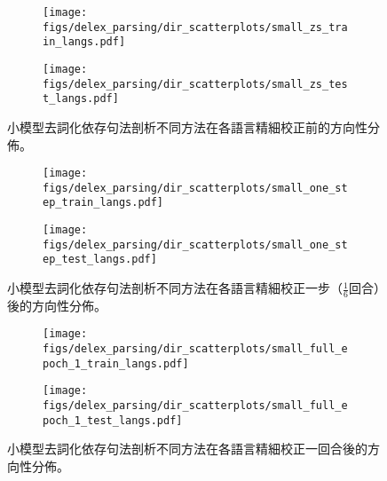 \begin{figure}[htbp]
    \centering
    \begin{subfigure}[t]{0.7\textwidth}
        \centering
        \texttt{[image: figs/delex\_parsing/dir\_scatterplots/small\_zs\_train\_langs.pdf]}
    \end{subfigure}
    \vspace{-12pt}
    \begin{subfigure}[t]{0.7\textwidth}
        \centering
        \texttt{[image: figs/delex\_parsing/dir\_scatterplots/small\_zs\_test\_langs.pdf]}
    \end{subfigure}
    \caption{小模型去詞化依存句法剖析不同方法在各語言精細校正前的方向性分佈。}
    \label{fig:small_dir_scatter_zs}
\end{figure}
\begin{figure}[htbp]
    \centering
    \begin{subfigure}[t]{0.7\textwidth}
        \centering
        \texttt{[image: figs/delex\_parsing/dir\_scatterplots/small\_one\_step\_train\_langs.pdf]}
    \end{subfigure}
    \vspace{-12pt}
    \begin{subfigure}[t]{0.7\textwidth}
        \centering
        \texttt{[image: figs/delex\_parsing/dir\_scatterplots/small\_one\_step\_test\_langs.pdf]}
    \end{subfigure}
    \caption{小模型去詞化依存句法剖析不同方法在各語言精細校正一步（$\frac{1}{6}$回合）後的方向性分佈。}
    \label{fig:small_dir_scatter_one_step}
\end{figure}
\begin{figure}[htbp]
    \centering
    \begin{subfigure}[t]{0.7\textwidth}
        \centering
        \texttt{[image: figs/delex\_parsing/dir\_scatterplots/small\_full\_epoch\_1\_train\_langs.pdf]}
    \end{subfigure}
    \vspace{-12pt}
    \begin{subfigure}[t]{0.7\textwidth}
        \centering
        \texttt{[image: figs/delex\_parsing/dir\_scatterplots/small\_full\_epoch\_1\_test\_langs.pdf]}
    \end{subfigure}
    \caption{小模型去詞化依存句法剖析不同方法在各語言精細校正一回合後的方向性分佈。}
    \label{fig:small_dir_scatter_full_epoch_1}
\end{figure}
